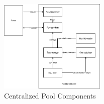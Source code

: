 \begin{figure}[htb]
	\centering
	\includegraphics[width = 0.45\textwidth]{content/images/ch3/system_component_centralized_pool.drawio.png}
	\caption{Centralized Pool Components}
	\label{fig:centralized_pool_components}
\end{figure}


